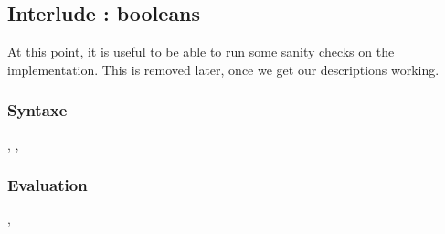 \documentclass[11pt]{article}
\begin{document}
\subsection{Interlude : booleans}
\label{sec:orgcb9768f}

At this point, it is useful to be able to run some sanity checks on the implementation.
This is removed later, once we get our descriptions working.

\subsubsection{Syntaxe}
\label{sec:org6ddf656}

\begin{decl}{\te, \tty, \tk}
 \drule{\ttrue}{}
 \drule{\tfalse}{}
\end{decl}

\subsubsection{Evaluation}
\label{sec:org1a39c57}

\begin{decl}{\ve, \vty}
    \drule{\vtrue}{}
    \drule{\vfalse}{}
    \drule{\vboolty}{}
\end{decl}

\begin{decl}{\vn}
    \drule{\ncond{\ve}{\tv}{\vty}{\ve[2]}{\ve[3]}}{}
\end{decl}


\end{document}
